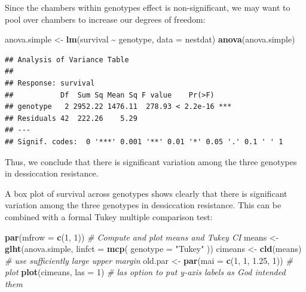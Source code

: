 \documentclass[
  12pt,
]{book}
\newenvironment{Shaded}{\begin{snugshade}}{\end{snugshade}}
\newcommand{\CommentTok}[1]{\textcolor[rgb]{0.56,0.35,0.01}{\textit{#1}}}
\newcommand{\DataTypeTok}[1]{\textcolor[rgb]{0.13,0.29,0.53}{#1}}
\newcommand{\DecValTok}[1]{\textcolor[rgb]{0.00,0.00,0.81}{#1}}
\newcommand{\FloatTok}[1]{\textcolor[rgb]{0.00,0.00,0.81}{#1}}
\newcommand{\KeywordTok}[1]{\textcolor[rgb]{0.13,0.29,0.53}{\textbf{#1}}}
\newcommand{\NormalTok}[1]{#1}
\newcommand{\OperatorTok}[1]{\textcolor[rgb]{0.81,0.36,0.00}{\textbf{#1}}}
\newcommand{\StringTok}[1]{\textcolor[rgb]{0.31,0.60,0.02}{#1}}
\begin{document}
Since the chambers within genotypes effect is non-significant, we may want to pool over chambers to increase our degrees of freedom:

\begin{Shaded}
\begin{Highlighting}[]
\NormalTok{anova.simple \textless{}{-}}\StringTok{ }\KeywordTok{lm}\NormalTok{(survival }\OperatorTok{\textasciitilde{}}\StringTok{ }\NormalTok{genotype, }\DataTypeTok{data =}\NormalTok{ nestdat)}
\KeywordTok{anova}\NormalTok{(anova.simple)}
\end{Highlighting}
\end{Shaded}

\begin{verbatim}
## Analysis of Variance Table
## 
## Response: survival
##           Df  Sum Sq Mean Sq F value    Pr(>F)    
## genotype   2 2952.22 1476.11  278.93 < 2.2e-16 ***
## Residuals 42  222.26    5.29                      
## ---
## Signif. codes:  0 '***' 0.001 '**' 0.01 '*' 0.05 '.' 0.1 ' ' 1
\end{verbatim}

Thus, we conclude that there is significant variation among the three genotypes in dessiccation resistance.

A box plot of survival across genotypes shows clearly that there is significant variation among the three genotypes in dessiccation resistance. This can be combined with a formal Tukey multiple comparison test:

\begin{Shaded}
\begin{Highlighting}[]
\KeywordTok{par}\NormalTok{(}\DataTypeTok{mfrow =} \KeywordTok{c}\NormalTok{(}\DecValTok{1}\NormalTok{, }\DecValTok{1}\NormalTok{))}
\CommentTok{\# Compute and plot means and Tukey CI}
\NormalTok{means \textless{}{-}}\StringTok{ }\KeywordTok{glht}\NormalTok{(anova.simple, }\DataTypeTok{linfct =} \KeywordTok{mcp}\NormalTok{(}
  \DataTypeTok{genotype =}
    \StringTok{"Tukey"}
\NormalTok{))}
\NormalTok{cimeans \textless{}{-}}\StringTok{ }\KeywordTok{cld}\NormalTok{(means)}
\CommentTok{\# use sufficiently large upper margin}
\NormalTok{old.par \textless{}{-}}\StringTok{ }\KeywordTok{par}\NormalTok{(}\DataTypeTok{mai =} \KeywordTok{c}\NormalTok{(}\DecValTok{1}\NormalTok{, }\DecValTok{1}\NormalTok{, }\FloatTok{1.25}\NormalTok{, }\DecValTok{1}\NormalTok{))}
\CommentTok{\# plot}
\KeywordTok{plot}\NormalTok{(cimeans, }\DataTypeTok{las =} \DecValTok{1}\NormalTok{) }\CommentTok{\# las option to put y{-}axis labels as God intended them}
\end{Highlighting}
\end{Shaded}
\end{document}
